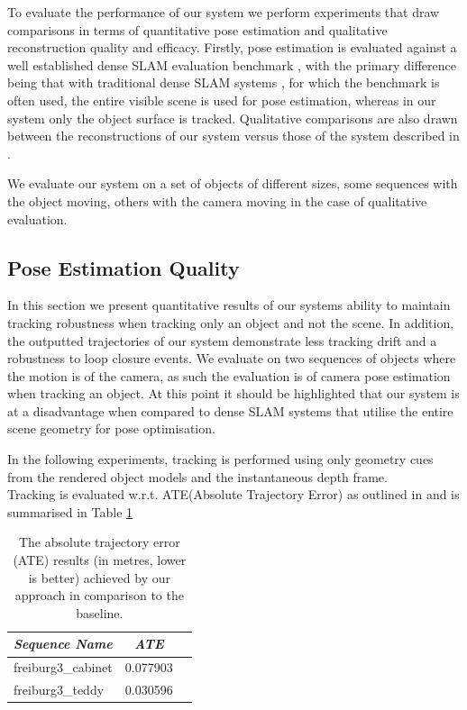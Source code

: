 To evaluate the performance of our system we perform experiments that draw comparisons in terms of quantitative pose estimation and qualitative reconstruction quality and efficacy.
Firstly, pose estimation is evaluated against a well established dense SLAM evaluation benchmark \cite{sturm12iros}, with the primary difference being that with traditional dense SLAM 
systems \cite{Prisacariu2014,Niessner2013,Newcombe2011}, for which the benchmark is often used, the entire visible scene is used for pose estimation, whereas in our system only the object 
surface is tracked. Qualitative comparisons are also drawn between the reconstructions of our system versus those of the system described in \cite{Ren2013}.

We evaluate our system on a set of objects of different sizes, some sequences with the object moving, others with the camera moving in the case of qualitative evaluation. 

\subsection{Pose Estimation Quality}
In this section we present quantitative results of our systems ability to maintain tracking robustness when tracking only an object and not the scene. In addition, the outputted trajectories 
of our system demonstrate less tracking drift and a robustness to loop closure events. We evaluate on two sequences of objects where the motion is of the camera, as such the evaluation is of 
camera pose estimation when tracking an object. At this point it should be highlighted that our system is at a disadvantage when compared to dense SLAM systems that utilise the entire scene 
geometry for pose optimisation.

In the following experiments, tracking is performed using only geometry cues from the rendered object models and the instantaneous depth frame.\\

Tracking is evaluated w.r.t. ATE(Absolute Trajectory Error) as outlined in \cite{sturm12iros} and is summarised in Table \ref{ateTable}
\begin{table}[!t]
	{\small
		\begin{center}
			\begin{tabular}{l@{\hskip 1cm} c c}
				\emph{Sequence Name} & \emph{ATE}\\
				\midrule
				\textsf{freiburg3\_cabinet} & 0.077903\\
				\textsf{freiburg3\_teddy} & 0.030596\\
			\end{tabular}
		\end{center}
	}
	\caption{The absolute trajectory error (ATE) results (in metres, lower is better) achieved by our approach in comparison to the baseline.}
	\label{ateTable}
\end{table}

